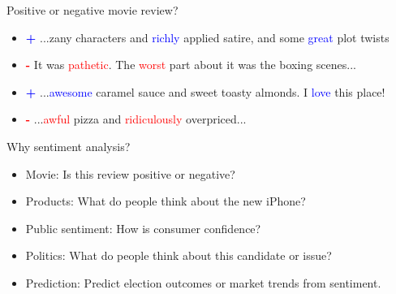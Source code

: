 \documentclass[handout]{beamer}
\begin{document}
\begin{frame}{Positive or negative movie review?}
    \begin{itemize}
     \item  \textcolor{blue}{\textbf{+}}   ...zany characters and \textcolor{blue}{richly} applied satire, and some \textcolor{blue}{great} plot twists 
     \item   \textcolor{red}{\textbf{-}} It was \textcolor{red}{pathetic}. The \textcolor{red}{worst} part about it was the boxing scenes... 
    \item   \textcolor{blue}{\textbf{+}}  ...\textcolor{blue}{awesome} caramel sauce and sweet toasty almonds. I \textcolor{blue}{love} this place! \\
     \item \textcolor{red}{\textbf{-}} ...\textcolor{red}{awful} pizza and \textcolor{red}{ridiculously} overpriced... 
    \end{itemize}

\end{frame}

\begin{frame}{Why sentiment analysis?}
    \begin{itemize}
        \item Movie: Is this review positive or negative?
        \item Products: What do people think about the new iPhone?
        \item Public sentiment: How is consumer confidence?
        \item Politics: What do people think about this candidate or issue?
        \item Prediction: Predict election outcomes or market trends from sentiment.
    \end{itemize}
\end{frame}
\end{document}
